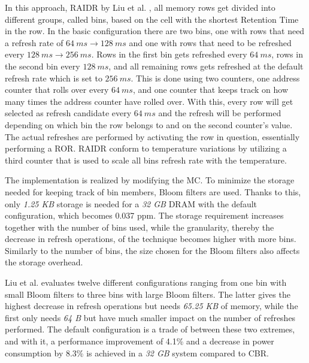 In this approach, RAIDR by Liu et al. \cite{raidr}, all memory rows get divided into different groups, called bins, based on the cell with the shortest Retention Time in the row. In the basic configuration there are two bins, one with rows that need a refresh rate of $64\:ms \to 128\:ms$ and one with rows that need to be refreshed every $128\:ms \to 256\:ms$. Rows in the first bin gets refreshed every $64\:ms$, rows in the second bin every $128\:ms$, and all remaining rows gets refreshed at the default refresh rate which is set to $256\:ms$. This is done using two counters, one address counter that rolls over every $64\:ms$, and one counter that keeps track on how many times the address counter have rolled over. With this, every row will get selected as refresh candidate every $64\:ms$ and the refresh will be performed depending on which bin the row belongs to and on the second counter's value. The actual refreshes are performed by activating the row in question, essentially performing a ROR. RAIDR conform to temperature variations by utilizing a third counter that is used to scale all bins refresh rate with the temperature.

The implementation is realized by modifying the MC. To minimize the storage needed for keeping track of bin members, Bloom filters are used. Thanks to this, only \textit{1.25 KB} storage is needed for a \textit{32 GB} DRAM with the default configuration, which becomes 0.037 ppm. The storage requirement increases together with the number of bins used, while the granularity, thereby the decrease in refresh operations, of the technique becomes higher with more bins. Similarly to the number of bins, the size chosen for the Bloom filters also affects the storage overhead.

Liu et al. evaluates twelve different configurations ranging from one bin with small Bloom filters to three bins with large Bloom filters. The latter gives the highest decrease in refresh operations but needs \textit{65.25 KB} of memory, while the first only needs \textit{64 B} but have much smaller impact on the number of refreshes performed. The default configuration is a trade of between these two extremes, and with it, a performance improvement of 4.1\% and a decrease in power consumption by 8.3\% is achieved in a \textit{32 GB} system compared to CBR.